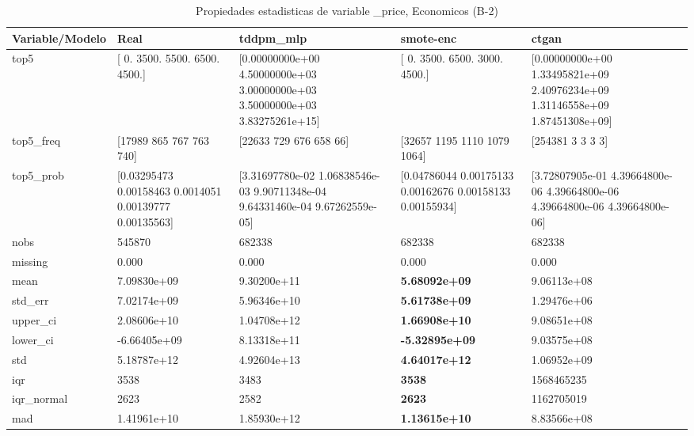 \begin{table}[H]
\centering
\fontsize{8}{14}\selectfont
\caption{Propiedades  estadisticas de variable \_price, Economicos (B-2)}
\label{table-stats-economicos-b-2-_price}
\begin{tabular}{|l|m{10em}|m{10em}|m{10em}|m{10em}|}
\hline
 \rowcolor[gray]{0.8}
Variable/Modelo & Real & tddpm\_mlp & smote-enc & ctgan \\
\hline top5 & [   0. 3500. 5500. 6500. 4500.] & [0.00000000e+00 4.50000000e+03 3.00000000e+03 3.50000000e+03
 3.83275261e+15] & [   0. 3500. 6500. 3000. 4500.] & [0.00000000e+00 1.33495821e+09 2.40976234e+09 1.31146558e+09
 1.87451308e+09] \\
\hline top5\_freq & [17989   865   767   763   740] & [22633   729   676   658    66] & [32657  1195  1110  1079  1064] & [254381      3      3      3      3] \\
\hline top5\_prob & [0.03295473 0.00158463 0.0014051  0.00139777 0.00135563] & [3.31697780e-02 1.06838546e-03 9.90711348e-04 9.64331460e-04
 9.67262559e-05] & [0.04786044 0.00175133 0.00162676 0.00158133 0.00155934] & [3.72807905e-01 4.39664800e-06 4.39664800e-06 4.39664800e-06
 4.39664800e-06] \\
\hline nobs & 545870 & 682338 & 682338 & 682338 \\
\hline missing & 0.000 & 0.000 & 0.000 & 0.000 \\
\hline mean & 7.09830e+09 & \cellcolor[rgb]{0.9, 0.54, 0.52} 9.30200e+11 & \bfseries 5.68092e+09 & 9.06113e+08 \\
\hline std\_err & 7.02174e+09 & \cellcolor[rgb]{0.9, 0.54, 0.52} 5.96346e+10 & \bfseries 5.61738e+09 & 1.29476e+06 \\
\hline upper\_ci & 2.08606e+10 & \cellcolor[rgb]{0.9, 0.54, 0.52} 1.04708e+12 & \bfseries 1.66908e+10 & 9.08651e+08 \\
\hline lower\_ci & -6.66405e+09 & \cellcolor[rgb]{0.9, 0.54, 0.52} 8.13318e+11 & \bfseries -5.32895e+09 & 9.03575e+08 \\
\hline std & 5.18787e+12 & \cellcolor[rgb]{0.9, 0.54, 0.52} 4.92604e+13 & \bfseries 4.64017e+12 & 1.06952e+09 \\
\hline iqr & 3538 & 3483 & \bfseries 3538 & \cellcolor[rgb]{0.9, 0.54, 0.52} 1568465235 \\
\hline iqr\_normal & 2623 & 2582 & \bfseries 2623 & \cellcolor[rgb]{0.9, 0.54, 0.52} 1162705019 \\
\hline mad & 1.41961e+10 & \cellcolor[rgb]{0.9, 0.54, 0.52} 1.85930e+12 & \bfseries 1.13615e+10 & 8.83566e+08 \\

\end{tabular}
\end{table}
